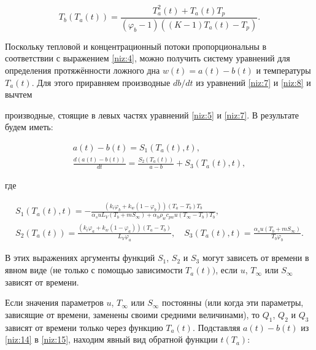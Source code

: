 \begin{equation}

T_b(T_a(t))=\frac{T_a^2(t)+T_a(t)T_p}{(\varphi_b-1)((K-1)T_a(t)-T_p)}.

\label{niz:13}

\end{equation}

Поскольку тепловой и концентрационный потоки пропорциональны в соответствии с выражением \eqref{niz:4}, можно получить систему уравнений для определения протяжённости ложного дна $w(t)=a(t)-b(t)$ и температуры $T_a(t)$. Для этого приравняем производные $db/dt$ из уравнений \eqref{niz:7} и \eqref{niz:8} и вычтем 

производные, стоящие в левых частях уравнений \eqref{niz:5} и \eqref{niz:7}. В результате будем иметь:

\begin{gather}

a(t)-b(t)=S_1(T_a(t),t),

\label{niz:14}


\\


\frac{d(a(t)-b(t))}{dt}=\frac{S_2(T_a(t))}{a-b}+S_3(T_a(t),t),

\label{niz:15}

\end{gather}

где

\begin{gather*}

S_1(T_a(t),t)=-\frac{(k_i\varphi_b+k_w(1-\varphi_b))(T_a-T_b)T_b}{\alpha_s uL_V(T_b+mS_\infty)+\alpha_h\rho_w c_{pw}u(T_\infty-T_b)T_b},

\\

S_2(T_a(t))=\frac{(k_i\varphi_a+k_w(1-\varphi_a ))(T_a-T_b)}{L_V\varphi_a}, \quad S_3(T_a(t),t)=\frac{\alpha_s u(T_b+mS_\infty)}{T_b\varphi_b}.

\end{gather*}

В этих выражениях аргументы функций $S_1$, $S_2$ и $S_3$ могут зависеть от времени в явном виде (не только с помощью зависимости $T_a(t))$, если $u$, $T_\infty$ или $S_\infty$ зависят от времени.



Если значения параметров $u$, $T_\infty$ или $S_\infty$ постоянны (или когда эти параметры, зависящие от времени, заменены своими средними величинами), то $Q_1$, $Q_2$ и $Q_3$ зависят от времени только через функцию $T_a(t)$. Подставляя $a(t)-b(t)$ из \eqref{niz:14} в \eqref{niz:15}, находим явный вид обратной функции $t(T_a)$:

